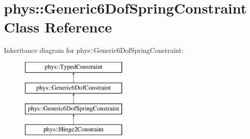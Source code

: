 \hypertarget{classphys_1_1Generic6DofSpringConstraint}{
\section{phys::Generic6DofSpringConstraint Class Reference}
\label{d1/dc7/classphys_1_1Generic6DofSpringConstraint}
}
Inheritance diagram for phys::Generic6DofSpringConstraint:\begin{figure}[H]
\begin{center}
\leavevmode
\includegraphics[height=4cm]{d1/dc7/classphys_1_1Generic6DofSpringConstraint}
\end{center}
\end{figure}

